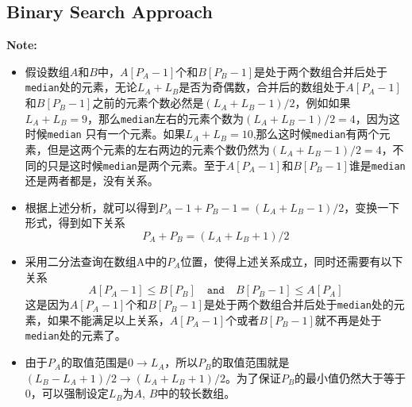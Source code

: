 \subsection{Binary Search Approach}
\textbf{\large{Note:}}
\par
\vspace{0.5em}
\begin{CJK*}{UTF8}{gbsn}
\begin{itemize}
\item 假设数组$A$和$B$中，$A[P_A-1]$个和$B[P_B-1]$是处于两个数组合并后处于\texttt{median}处的元素，无论$L_A+L_B$是否为奇偶数，合并后的数组处于$A[P_A-1]$和$B[P_B-1]$之前的元素个数必然是$(L_A+L_B-1)/2$，例如如果$L_A+L_B = 9$，那么\texttt{median}左右的元素个数为$(L_A+L_B-1)/2=4$，因为这时候\texttt{median} 只有一个元素。如果$L_A+L_B = 10$,那么这时候\texttt{median}有两个元素，但是这两个元素的左右两边的元素个数仍然为$(L_A+L_B-1)/2=4$，不同的只是这时候\texttt{median}是两个元素。至于$A[P_A-1]$和$B[P_B-1]$谁是\texttt{median}还是两者都是，没有关系。
\item 根据上述分析，就可以得到$P_A-1+P_B-1 =(L_A+L_B-1)/2 $，变换一下形式，得到如下关系
\[
P_A + P_B = (L_A+L_B+1)/2
\]
\item 采用二分法查询在数组A中的$P_A$位置，使得上述关系成立，同时还需要有以下关系
\[
A[P_A - 1] \leq B[P_B] \quad \mathtt{and} \quad B[P_B - 1] \leq A[P_A]
\]
这是因为$A[P_A-1]$个和$B[P_B-1]$是处于两个数组合并后处于\texttt{median}处的元素，如果不能满足以上关系，$A[P_A-1]$个或者$B[P_B-1]$就不再是处于\texttt{median}处的元素了。
\item 由于$P_A$的取值范围是$0\to L_A$，所以$P_B$的取值范围就是$(L_B-L_A+1)/2 \to (L_A+L_B+1)/2$。为了保证$P_B$的最小值仍然大于等于0，可以强制设定$L_B$为$A$, $B$中的较长数组。
\end{itemize}
\end{CJK*}

